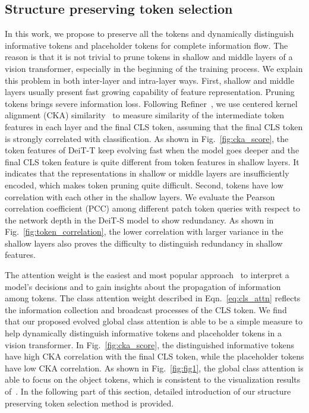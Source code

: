 \documentclass[letterpaper]{article} \usepackage{aaai22}  \usepackage{times}  \usepackage{helvet}  \usepackage{courier}  \usepackage[hyphens]{url}  \usepackage{graphicx} \urlstyle{rm} \def\UrlFont{\rm}  \usepackage{natbib}  \usepackage{caption} \DeclareCaptionStyle{ruled}{labelfont=normalfont,labelsep=colon,strut=off} \frenchspacing  \setlength{\pdfpagewidth}{8.5in}  \setlength{\pdfpageheight}{11in}  \usepackage{algorithm}
\begin{document}
\subsection{Structure preserving token selection}
\label{sec:cls_attn_analysis}
In this work, we propose to preserve all the tokens and dynamically distinguish informative tokens and placeholder tokens for complete information flow. The reason is that it is  not trivial to prune tokens in shallow and middle layers of a vision transformer, especially in the beginning of the training process. We explain this problem in both inter-layer and intra-layer ways. 
First, shallow and middle layers usually present fast growing capability of feature representation. Pruning tokens brings severe information loss. 
Following Refiner~\cite{Refiner}, we use centered kernel alignment (CKA) similarity~\cite{CKA} to measure similarity of the intermediate token features in each layer and the final CLS token, assuming that the final CLS token is strongly correlated with classification.  As shown in Fig.~\ref{fig:cka_score}, the token features of DeiT-T keep evolving fast when the model goes deeper and the final CLS token feature is quite different from token features in shallow layers. It indicates that the representations in shallow or middle layers are insufficiently encoded, which makes token pruning quite difficult. 
Second, tokens have low correlation with each other in the shallow layers.
We evaluate the Pearson correlation coefficient (PCC) among different patch token queries with respect to the network depth in the DeiT-S model to show 
redundancy. As shown in Fig.~\ref{fig:token_correlation}, the lower correlation with larger variance in the shallow layers also proves the difficulty to distinguish redundancy in shallow features. 


The attention weight is the easiest and most popular approach~\cite{Attention_rollout,EvolvingAttn} to interpret a model’s decisions and to gain insights about the propagation of information among tokens. The class attention weight described in Eqn.~\ref{eq:cls_attn} reflects the information collection and broadcast processes of the CLS token. We find that our proposed evolved global class attention is able to be a simple measure to help dynamically distinguish informative tokens and placeholder tokens in a vision transformer. In Fig.~\ref{fig:cka_score}, the distinguished informative tokens have high CKA correlation with the final CLS token, while the placeholder tokens have low CKA correlation.
As shown in Fig.~\ref{fig:fig1},  the global class attention is able to focus on the object tokens, which is consistent to the visualization results of~\cite{Trans_interpretability}. In the following part of this section, detailed introduction of our structure preserving token selection method is provided.
\end{document}
